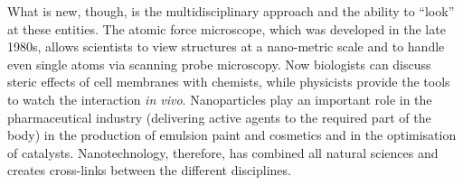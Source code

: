 \documentclass[a4paper]{article}
\begin{document}
What is new, though, is the multidisciplinary approach and the ability to
\enquote{look} at these entities. The atomic force microscope, which was
developed in the late 1980s, allows scientists to view structures at a
nano-metric scale and to handle even single atoms via scanning probe microscopy.
Now biologists can discuss steric effects of cell membranes with chemists, while
physicists provide the tools to watch the interaction \textit{in vivo}.
Nanoparticles play an important role in the pharmaceutical industry (delivering
active agents to the required part of the body) in the production of emulsion
paint and cosmetics and in the optimisation of catalysts. Nanotechnology,
therefore, has combined all natural sciences and creates cross-links between the
different disciplines.
\end{document}
